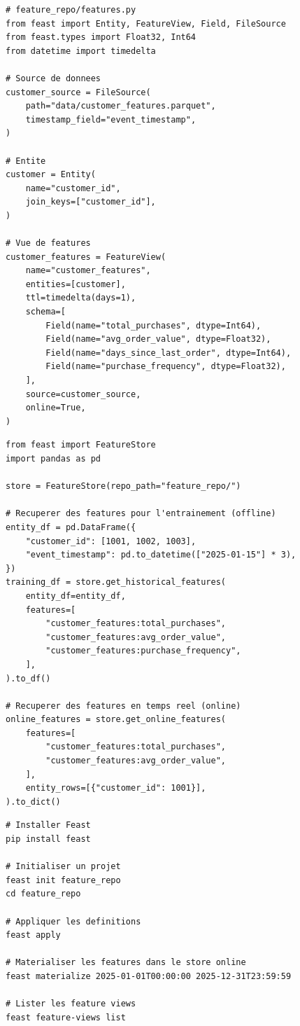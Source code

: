 \begin{codeblock}[title=\textbf{D\'efinition de features avec Feast}]
\begin{verbatim}
# feature_repo/features.py
from feast import Entity, FeatureView, Field, FileSource
from feast.types import Float32, Int64
from datetime import timedelta

# Source de donnees
customer_source = FileSource(
    path="data/customer_features.parquet",
    timestamp_field="event_timestamp",
)

# Entite
customer = Entity(
    name="customer_id",
    join_keys=["customer_id"],
)

# Vue de features
customer_features = FeatureView(
    name="customer_features",
    entities=[customer],
    ttl=timedelta(days=1),
    schema=[
        Field(name="total_purchases", dtype=Int64),
        Field(name="avg_order_value", dtype=Float32),
        Field(name="days_since_last_order", dtype=Int64),
        Field(name="purchase_frequency", dtype=Float32),
    ],
    source=customer_source,
    online=True,
)
\end{verbatim}
\end{codeblock}

\begin{codeblock}[title=\textbf{Utilisation de Feast}]
\begin{verbatim}
from feast import FeatureStore
import pandas as pd

store = FeatureStore(repo_path="feature_repo/")

# Recuperer des features pour l'entrainement (offline)
entity_df = pd.DataFrame({
    "customer_id": [1001, 1002, 1003],
    "event_timestamp": pd.to_datetime(["2025-01-15"] * 3),
})
training_df = store.get_historical_features(
    entity_df=entity_df,
    features=[
        "customer_features:total_purchases",
        "customer_features:avg_order_value",
        "customer_features:purchase_frequency",
    ],
).to_df()

# Recuperer des features en temps reel (online)
online_features = store.get_online_features(
    features=[
        "customer_features:total_purchases",
        "customer_features:avg_order_value",
    ],
    entity_rows=[{"customer_id": 1001}],
).to_dict()
\end{verbatim}
\end{codeblock}

\begin{codeblock}[title=\textbf{Commandes Feast}]
\begin{verbatim}
# Installer Feast
pip install feast

# Initialiser un projet
feast init feature_repo
cd feature_repo

# Appliquer les definitions
feast apply

# Materialiser les features dans le store online
feast materialize 2025-01-01T00:00:00 2025-12-31T23:59:59

# Lister les feature views
feast feature-views list
\end{verbatim}
\end{codeblock}

